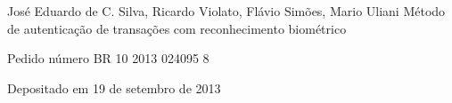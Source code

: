 

\begin{cvpublications}


  \cvpublication
    {José Eduardo de C. Silva, Ricardo Violato, Flávio Simões, Mario Uliani} %
    {Método de autenticação de transações com reconhecimento biométrico} %
    {} %
    {} %
    {
      \begin{cvitems} %
        \item {Pedido número BR 10 2013 024095 8}
        \item {Depositado em 19 de setembro de 2013}
      \end{cvitems}
    }




\end{cvpublications}
